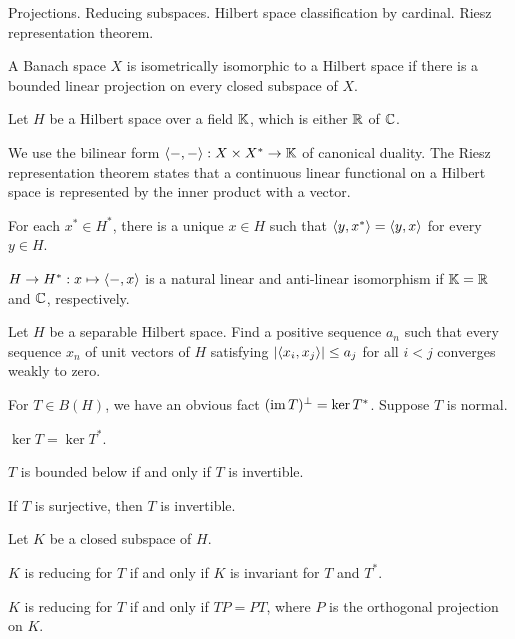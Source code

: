 \documentclass{../../large}
\begin{document}
Projections. Reducing subspaces.
Hilbert space classification by cardinal.
Riesz representation theorem.
\begin{prb}
\begin{parts}
\item A Banach space $X$ is isometrically isomorphic to a Hilbert space if there is a bounded linear projection on every closed subspace of $X$.
\end{parts}
\end{prb}

\begin{prb}
Let $H$ be a Hilbert space over a field $\mathbb{K}$, which is either $\mathbb{R}$ of $\mathbb{C}$.


We use the bilinear form $\langle-,-\rangle:X\times X^*\to\mathbb{K}$ of canonical duality.
The Riesz representation theorem states that a continuous linear functional on a Hilbert space is represented by the inner product with a vector.
\begin{parts}
\item For each $x^*\in H^*$, there is a unique $x\in H$ such that $\langle y,x^*\rangle=\langle y,x\rangle$ for every $y\in H$.
\item $H\to H^*:x\mapsto\langle-,x\rangle$ is a natural linear and anti-linear isomorphism if $\mathbb{K}=\mathbb{R}$ and $\mathbb{C}$, respectively.
\end{parts}
\end{prb}



Let $H$ be a separable Hilbert space.
Find a positive sequence $a_n$ such that every sequence $x_n$ of unit vectors of $H$ satisfying $|\langle x_i,x_j\rangle|\le a_j$ for all $i<j$ converges weakly to zero.



\begin{prb}
For $T\in B(H)$, we have an obvious fact $(\operatorname{im} T)^\perp=\ker T^*$.
Suppose $T$ is normal.
\begin{parts}
\item $\ker T=\ker T^*$.
\item $T$ is bounded below if and only if $T$ is invertible.
\item If $T$ is surjective, then $T$ is invertible.
\end{parts}
\end{prb}

\begin{prb}
Let $K$ be a closed subspace of $H$.
\begin{parts}
\item $K$ is reducing for $T$ if and only if $K$ is invariant for $T$ and $T^*$.
\item $K$ is reducing for $T$ if and only if $TP=PT$, where $P$ is the orthogonal projection on $K$.
\end{parts}
\end{prb}
\end{document}

